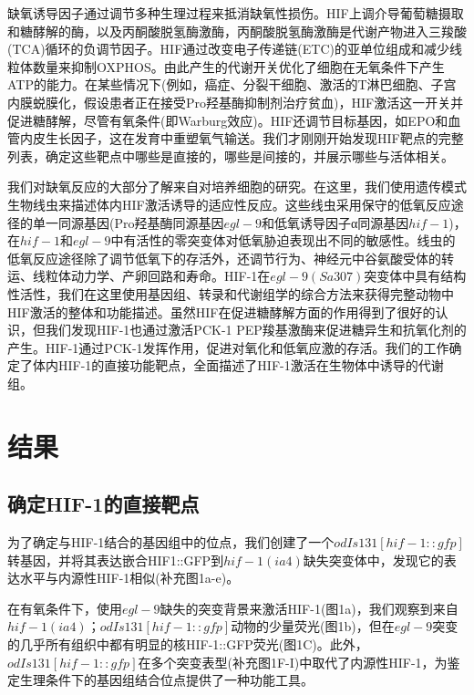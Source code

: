 \documentclass{ctexart}
\begin{document}
        缺氧诱导因子通过调节多种生理过程来抵消缺氧性损伤。HIF上调介导葡萄糖摄取和糖酵解的酶，以及丙酮酸脱氢酶激酶，丙酮酸脱氢酶激酶是代谢产物进入三羧酸(TCA)循环的负调节因子。HIF通过改变电子传递链(ETC)的亚单位组成和减少线粒体数量来抑制OXPHOS。由此产生的代谢开关优化了细胞在无氧条件下产生ATP的能力。在某些情况下(例如，癌症、分裂干细胞、激活的T淋巴细胞、子宫内膜蜕膜化，假设患者正在接受Pro羟基酶抑制剂治疗贫血)，HIF激活这一开关并促进糖酵解，尽管有氧条件(即Warburg效应)。HIF还调节目标基因，如EPO和血管内皮生长因子，这在发育中重塑氧气输送。我们才刚刚开始发现HIF靶点的完整列表，确定这些靶点中哪些是直接的，哪些是间接的，并展示哪些与活体相关。

        我们对缺氧反应的大部分了解来自对培养细胞的研究。在这里，我们使用遗传模式生物线虫来描述体内HIF激活诱导的适应性反应。这些线虫采用保守的低氧反应途径的单一同源基因(Pro羟基酶同源基因$egl-9$和低氧诱导因子α同源基因$hif-1$)，在$hif-1$和$egl-9$中有活性的零突变体对低氧胁迫表现出不同的敏感性。线虫的低氧反应途径除了调节低氧下的存活外，还调节行为、神经元中谷氨酸受体的转运、线粒体动力学、产卵回路和寿命。HIF-1在$egl-9(Sa307)$突变体中具有结构性活性，我们在这里使用基因组、转录和代谢组学的综合方法来获得完整动物中HIF激活的整体和功能描述。虽然HIF在促进糖酵解方面的作用得到了很好的认识，但我们发现HIF-1也通过激活PCK-1 PEP羧基激酶来促进糖异生和抗氧化剂的产生。HIF-1通过PCK-1发挥作用，促进对氧化和低氧应激的存活。我们的工作确定了体内HIF-1的直接功能靶点，全面描述了HIF-1激活在生物体中诱导的代谢组。


    

    \section{结果}
    \subsection{确定HIF-1的直接靶点}

        为了确定与HIF-1结合的基因组中的位点，我们创建了一个$odIs131[hif-1::gfp]$转基因，并将其表达嵌合HIF1::GFP到$hif-1(ia4)$缺失突变体中，发现它的表达水平与内源性HIF-1相似(补充图1a-e)。

        在有氧条件下，使用$egl-9$缺失的突变背景来激活HIF-1(图1a)，我们观察到来自$hif-1(ia4)$；$odIs131[hif-1::gfp]$动物的少量荧光(图1b)，但在$egl-9$突变的几乎所有组织中都有明显的核HIF-1::GFP荧光(图1C)。此外，$odIs131[hif-1::gfp]$在多个突变表型(补充图1F-I)中取代了内源性HIF-1，为鉴定生理条件下的基因组结合位点提供了一种功能工具。
        
\end{document}
